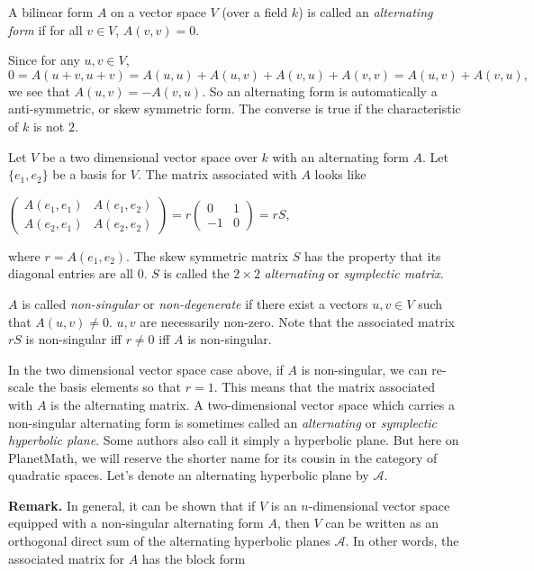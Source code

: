\documentclass[12pt]{article}
\begin{document}
A bilinear form $A$ on a vector space $V$ (over a field $k$) is called an \emph{alternating form} if for all $v\in V$, $A(v,v)=0$.

Since for any $u,v\in V$, $$0=A(u+v,u+v)=A(u,u)+A(u,v)+A(v,u)+A(v,v)=A(u,v)+A(v,u),$$ we see that $A(u,v)=-A(v,u)$.  So an alternating form is automatically a anti-symmetric, or skew symmetric form.  The converse is true if the characteristic of $k$ is not $2$.

Let $V$ be a two dimensional vector space over $k$ with an alternating form $A$. Let $\lbrace e_1,e_2\rbrace$ be a basis for $V$.  The matrix associated with $A$ looks like 

\begin{center}$
\begin{pmatrix}
A(e_1,e_1) & A(e_1,e_2) \\
A(e_2,e_1) & A(e_2,e_2)
\end{pmatrix}=r
\begin{pmatrix}
0 & 1 \\
-1 & 0
\end{pmatrix}=rS,
$\end{center}

where $r=A(e_1,e_2)$.  The skew symmetric matrix $S$ has the property that its diagonal entries are all $0$.  $S$ is called the $2\times 2$ \emph{alternating} or \emph{symplectic matrix}.   

$A$ is called \emph{non-singular} or \emph{non-degenerate} if there exist a vectors $u,v\in V$ such that $A(u,v)\neq 0$.  $u,v$ are necessarily non-zero.  Note that the associated matrix $rS$ is non-singular iff $r\neq 0$ iff $A$ is non-singular.  

In the two dimensional vector space case above, if $A$ is non-singular, we can re-scale the basis elements so that $r=1$.  This means that the matrix associated with $A$ is the alternating matrix.  A two-dimensional vector space which carries a non-singular alternating form is sometimes called an \emph{alternating} or \emph{symplectic hyperbolic plane}.  Some authors also call it simply a hyperbolic plane.  But here on PlanetMath, we will reserve the shorter name for its cousin in the category of quadratic spaces.  Let's denote an alternating hyperbolic plane by $\mathcal{A}$.

\textbf{Remark.}  In general, it can be shown that if $V$ is an $n$-dimensional vector space equipped with a non-singular alternating form $A$, then $V$ can be written as an orthogonal direct sum of the alternating hyperbolic planes $\mathcal{A}$.  In other words, the associated matrix for $A$ has the block form
\end{document}
